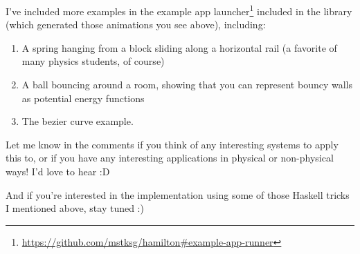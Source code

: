 \documentclass[]{article}
\renewcommand{\href}[2]{#2\footnote{\url{#1}}}
\begin{document}
I've included more examples in the
\href{https://github.com/mstksg/hamilton\#example-app-runner}{example app
launcher} included in the library (which generated those animations you see
above), including:

\begin{enumerate}
\def\labelenumi{\arabic{enumi}.}
\tightlist
\item
  A spring hanging from a block sliding along a horizontal rail (a favorite of
  many physics students, of course)
\item
  A ball bouncing around a room, showing that you can represent bouncy walls as
  potential energy functions
\item
  The bezier curve example.
\end{enumerate}

Let me know in the comments if you think of any interesting systems to apply
this to, or if you have any interesting applications in physical or non-physical
ways! I'd love to hear :D

And if you're interested in the implementation using some of those Haskell
tricks I mentioned above, stay tuned :)
\end{document}
